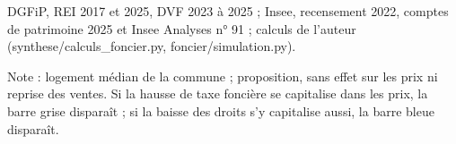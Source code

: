 DGFiP, REI 2017 et 2025, DVF 2023 à 2025 ; Insee, recensement 2022, comptes de patrimoine 2025 et Insee Analyses n° 91 ; calculs de l'auteur (synthese/calculs\_foncier.py, foncier/simulation.py).\par Note : logement médian de la commune ; proposition, sans effet sur les prix ni reprise des ventes. Si la hausse de taxe foncière se capitalise dans les prix, la barre grise disparaît ; si la baisse des droits s'y capitalise aussi, la barre bleue disparaît.
